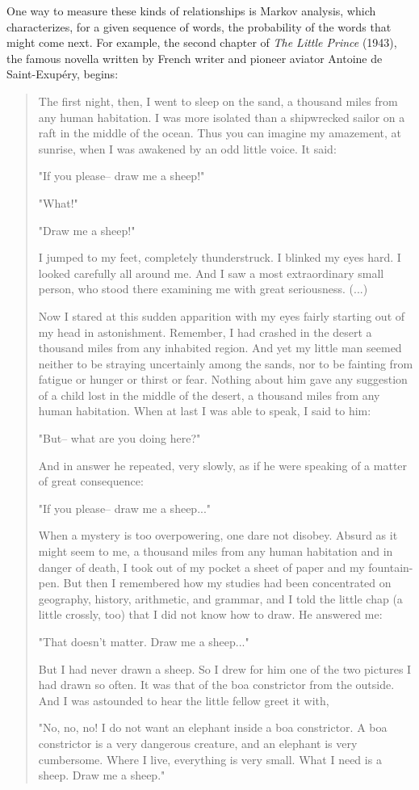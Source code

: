 One way to measure these kinds of relationships is Markov
analysis, which characterizes, for a given sequence of words, 
the probability of the words that might come next.  For example, 
the second chapter of \emph{The Little Prince} (1943), the 
famous novella written by French writer and pioneer aviator 
Antoine de Saint-Exupéry, begins:

\begin{quote}
The first night, then, I went to sleep on the sand, a thousand miles from any human habitation. I was more isolated than a shipwrecked sailor on a raft in the middle of the ocean. Thus you can imagine my amazement, at sunrise, when I was awakened by an odd little voice. It said:

 "If you please-- draw me a sheep!"

 "What!"

 "Draw me a sheep!"

 I jumped to my feet, completely thunderstruck. I blinked my eyes hard. I looked carefully all around me. And I saw a most extraordinary small person, who stood there examining me with great seriousness. (...) 

 Now I stared at this sudden apparition with my eyes fairly starting out of my head in astonishment. Remember, I had crashed in the desert a thousand miles from any inhabited region. And yet my little man seemed neither to be straying uncertainly among the sands, nor to be fainting from fatigue or hunger or thirst or fear. Nothing about him gave any suggestion of a child lost in the middle of the desert, a thousand miles from any human habitation. When at last I was able to speak, I said to him:

 "But-- what are you doing here?"

 And in answer he repeated, very slowly, as if he were speaking of a matter of great consequence:

 "If you please-- draw me a sheep..."

 When a mystery is too overpowering, one dare not disobey. Absurd as it might seem to me, a thousand miles from any human habitation and in danger of death, I took out of my pocket a sheet of paper and my fountain-pen. But then I remembered how my studies had been concentrated on geography, history, arithmetic, and grammar, and I told the little chap (a little crossly, too) that I did not know how to draw. He answered me:

 "That doesn't matter. Draw me a sheep..."

 But I had never drawn a sheep. So I drew for him one of the two pictures I had drawn so often. It was that of the boa constrictor from the outside. And I was astounded to hear the little fellow greet it with,

 "No, no, no! I do not want an elephant inside a boa constrictor. A boa constrictor is a very dangerous creature, and an elephant is very cumbersome. Where I live, everything is very small. What I need is a sheep. Draw me a sheep." 
  
\end{quote}
